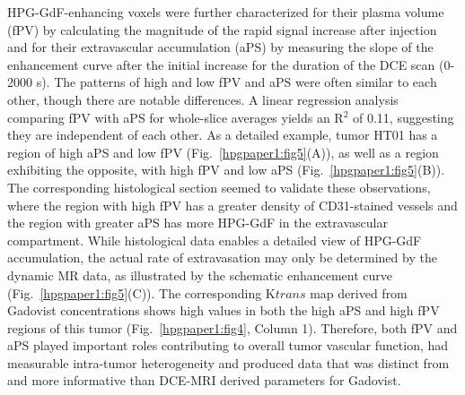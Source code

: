 HPG-GdF-enhancing voxels were further characterized for their plasma volume (fPV) by calculating the magnitude of the rapid signal increase after injection and for their extravascular accumulation (aPS) by measuring the slope of the enhancement curve after the initial increase for the duration of the DCE scan (0-2000 s).
The patterns of high and low fPV and aPS were often similar to each other, though there are notable differences.
A linear regression analysis comparing fPV with aPS for whole-slice averages yields an R$^2$ of 0.11, suggesting they are independent of each other.
As a detailed example, tumor HT01 has a region of high aPS and low fPV (Fig.~\ref{hpgpaper1:fig5}(A)), as well as a region exhibiting the opposite, with high fPV and low aPS (Fig.~\ref{hpgpaper1:fig5}(B)).
The corresponding histological section seemed to validate these observations, where the region with high fPV has a greater density of CD31-stained vessels and the region with greater aPS has more HPG-GdF in the extravascular compartment.
While histological data enables a detailed view of HPG-GdF accumulation, the actual rate of extravasation may only be determined by the dynamic MR data, as illustrated by the schematic enhancement curve (Fig.~\ref{hpgpaper1:fig5}(C)).
The corresponding K${trans}$ map derived from Gadovist concentrations shows high values in both the high aPS and high fPV regions of this tumor (Fig.~\ref{hpgpaper1:fig4}, Column 1).
Therefore, both fPV and aPS played important roles contributing to overall tumor vascular function, had measurable intra-tumor heterogeneity and produced data that was distinct from and more informative than DCE-MRI derived parameters for Gadovist.

